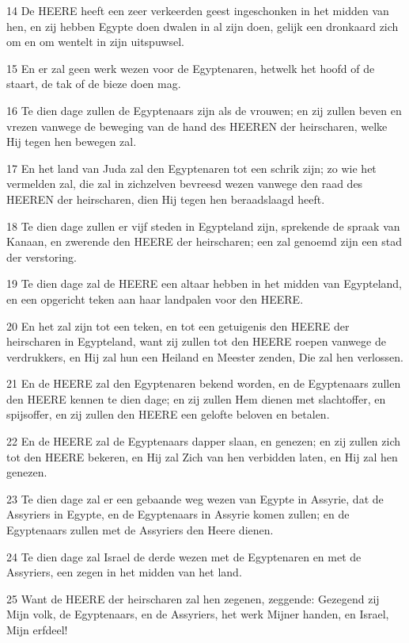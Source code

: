 \par 14 De HEERE heeft een zeer verkeerden geest ingeschonken in het midden van hen, en zij hebben Egypte doen dwalen in al zijn doen, gelijk een dronkaard zich om en om wentelt in zijn uitspuwsel.
\par 15 En er zal geen werk wezen voor de Egyptenaren, hetwelk het hoofd of de staart, de tak of de bieze doen mag.
\par 16 Te dien dage zullen de Egyptenaars zijn als de vrouwen; en zij zullen beven en vrezen vanwege de beweging van de hand des HEEREN der heirscharen, welke Hij tegen hen bewegen zal.
\par 17 En het land van Juda zal den Egyptenaren tot een schrik zijn; zo wie het vermelden zal, die zal in zichzelven bevreesd wezen vanwege den raad des HEEREN der heirscharen, dien Hij tegen hen beraadslaagd heeft.
\par 18 Te dien dage zullen er vijf steden in Egypteland zijn, sprekende de spraak van Kanaan, en zwerende den HEERE der heirscharen; een zal genoemd zijn een stad der verstoring.
\par 19 Te dien dage zal de HEERE een altaar hebben in het midden van Egypteland, en een opgericht teken aan haar landpalen voor den HEERE.
\par 20 En het zal zijn tot een teken, en tot een getuigenis den HEERE der heirscharen in Egypteland, want zij zullen tot den HEERE roepen vanwege de verdrukkers, en Hij zal hun een Heiland en Meester zenden, Die zal hen verlossen.
\par 21 En de HEERE zal den Egyptenaren bekend worden, en de Egyptenaars zullen den HEERE kennen te dien dage; en zij zullen Hem dienen met slachtoffer, en spijsoffer, en zij zullen den HEERE een gelofte beloven en betalen.
\par 22 En de HEERE zal de Egyptenaars dapper slaan, en genezen; en zij zullen zich tot den HEERE bekeren, en Hij zal Zich van hen verbidden laten, en Hij zal hen genezen.
\par 23 Te dien dage zal er een gebaande weg wezen van Egypte in Assyrie, dat de Assyriers in Egypte, en de Egyptenaars in Assyrie komen zullen; en de Egyptenaars zullen met de Assyriers den Heere dienen.
\par 24 Te dien dage zal Israel de derde wezen met de Egyptenaren en met de Assyriers, een zegen in het midden van het land.
\par 25 Want de HEERE der heirscharen zal hen zegenen, zeggende: Gezegend zij Mijn volk, de Egyptenaars, en de Assyriers, het werk Mijner handen, en Israel, Mijn erfdeel!

